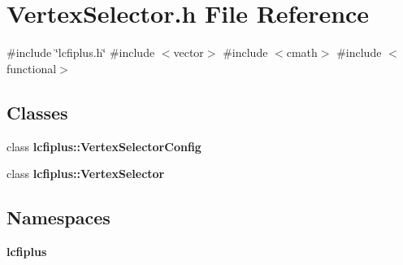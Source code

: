 \section{Vertex\+Selector.\+h File Reference}
\label{VertexSelector_8h}
{\ttfamily \#include \char`\"{}lcfiplus.\+h\char`\"{}}\newline
{\ttfamily \#include $<$vector$>$}\newline
{\ttfamily \#include $<$cmath$>$}\newline
{\ttfamily \#include $<$functional$>$}\newline
\subsection*{Classes}
\begin{DoxyCompactItemize}
\item 
class \textbf{ lcfiplus\+::\+Vertex\+Selector\+Config}
\item 
class \textbf{ lcfiplus\+::\+Vertex\+Selector}
\end{DoxyCompactItemize}
\subsection*{Namespaces}
\begin{DoxyCompactItemize}
\item 
 \textbf{ lcfiplus}
\end{DoxyCompactItemize}
